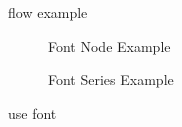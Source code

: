 

\begin{figure}
    
    \caption{flow example}
\end{figure}

\begin{figure}
    \begin{subfigure}{0.48\linewidth}
        
        \caption{Font Node Example}
    \end{subfigure}
    \begin{subfigure}{0.48\linewidth}
        
        \caption{Font Series Example}
    \end{subfigure}
    \caption{use font}
\end{figure}

